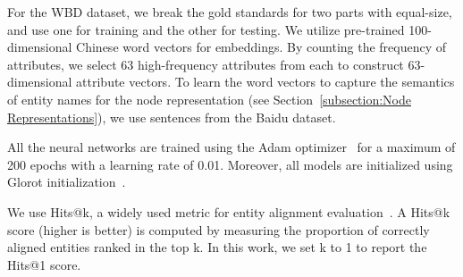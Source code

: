 	For the WBD dataset, we break the gold standards for two parts with equal-size, and use one for training and the other for testing.
	We utilize pre-trained 100-dimensional Chinese word vectors for embeddings.
	By counting the frequency of attributes, we select 63 high-frequency attributes from each \KG to construct 63-dimensional attribute vectors.
     To learn the word vectors to capture the semantics of entity names for the node representation (see Section~\ref{subsection:Node
    Representations}), we use sentences from  the Baidu dataset.


 	All the neural networks are trained using the Adam optimizer~\cite{Kingma2014Adam} for a maximum of 200 epochs with a
 learning rate of 0.01.  Moreover, all models are initialized using Glorot initialization~\cite{Glorot2010Understanding}.

	
 	We use Hits@k, a widely used metric for entity
 alignment evaluation~\cite{hao2016joint,chen2016multilingual,sun2017cross,zhu2017iterative}. A Hits@k score (higher is better) is computed by
 measuring the proportion of correctly aligned entities ranked in the top k. In this work, we set k to 1 to report the Hits@1 score. 
	
	
